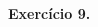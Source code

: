 \documentclass[oneside,12pt]{article}
\begin{document}
\newpage


\def\IT{\ga{instrthin}}
\def\ITS{\IT & \IT & \IT & \IT & \IT & \IT & \IT & \IT & \IT }

$\scalebox{0.6}{$
 \begin{matrix}
 \ITS \\
 \ITS \\
 \ITS \\
 \ITS \\
 \ITS \\
 \ITS \\
 \ITS \\
 \ITS \\
 \ITS \\
 \end{matrix}
 $}
$


\newpage


{\bf Exercício 9.}
\end{document}
